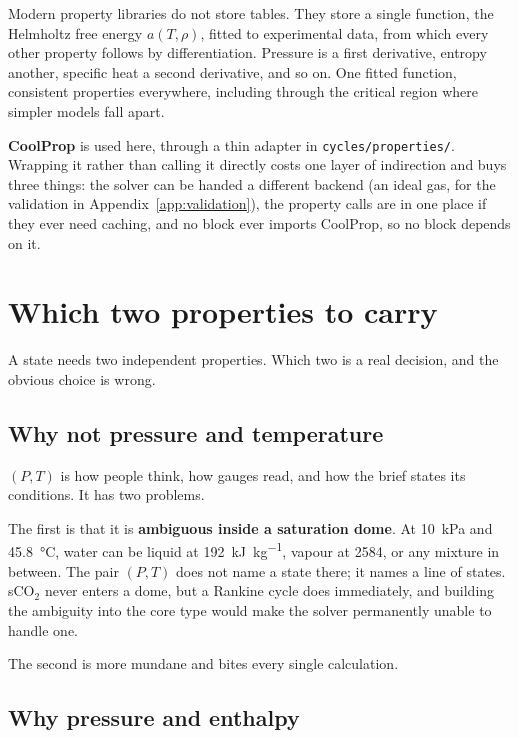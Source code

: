 \documentclass[11pt,a4paper]{report}
\newcommand{\code}[1]{\texttt{\small #1}}
\begin{document}
Modern property libraries do not store tables. They store a single
function, the Helmholtz free energy $a(T, \rho)$, fitted to experimental
data, from which every other property follows by differentiation. Pressure
is a first derivative, entropy another, specific heat a second derivative,
and so on. One fitted function, consistent properties everywhere, including
through the critical region where simpler models fall apart.

\begin{choicebox}
\textbf{CoolProp} is used here, through a thin adapter in
\code{cycles/properties/}. Wrapping it rather than calling it directly costs
one layer of indirection and buys three things: the solver can be handed a
different backend (an ideal gas, for the validation in
Appendix~\ref{app:validation}), the property calls are in one place if they
ever need caching, and no block ever imports CoolProp, so no block depends
on it.
\end{choicebox}

\section{Which two properties to carry}

A state needs two independent properties. Which two is a real decision, and
the obvious choice is wrong.

\subsection{Why not pressure and temperature}

$(P,T)$ is how people think, how gauges read, and how the brief states its
conditions. It has two problems.

The first is that it is \textbf{ambiguous inside a saturation dome}. At
\SI{10}{\kilo\pascal} and \SI{45.8}{\celsius}, water can be liquid at
\SI{192}{\kilo\joule\per\kilogram}, vapour at \SI{2584}{}, or any mixture
in between. The pair $(P,T)$ does not name a state there; it names a line of
states. sCO$_2$ never enters a dome, but a Rankine cycle does immediately,
and building the ambiguity into the core type would make the solver
permanently unable to handle one.

The second is more mundane and bites every single calculation.

\subsection{Why pressure and enthalpy}
\end{document}
